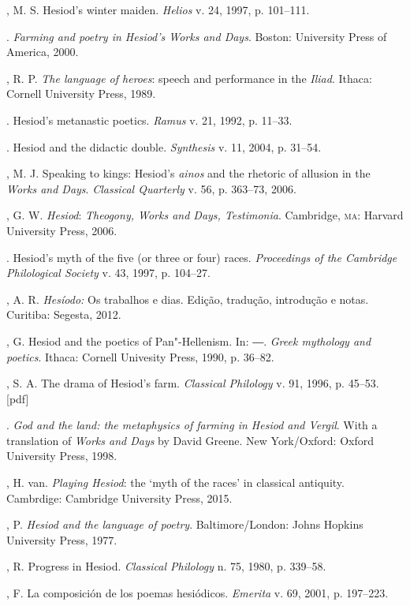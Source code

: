 \begin{bibliohedra}
, M. S. Hesiod's winter maiden. \emph{Helios} v. 24, 1997, p.
101--111.

\titidem. \emph{Farming and poetry in Hesiod's Works and Days}. Boston:
University Press of America, 2000.

, R. P. \emph{The language of heroes}: speech and performance in
the \emph{Iliad}. Ithaca: Cornell University Press, 1989.

\titidem. Hesiod's metanastic poetics. \emph{Ramus} v. 21, 1992, p. 11--33.

\titidem. Hesiod and the didactic double. \emph{Synthesis} v. 11, 2004, p.
31--54.

, M. J. Speaking to kings: Hesiod's \emph{ainos} and the rhetoric
of allusion in the \emph{Works and Days}. \emph{Classical Quarterly} v.
56, p. 363--73, 2006.

, G. W. \emph{Hesiod}: \emph{Theogony, Works and Days, Testimonia}.
Cambridge, \textsc{ma}: Harvard University Press, 2006.

\titidem. Hesiod's myth of the five (or three or four) races. \emph{Proceedings
of the Cambridge Philological Society} v. 43, 1997, p. 104--27.

, A. R. \emph{Hesíodo:} Os trabalhos e dias. Edição, tradução,
introdução e notas. Curitiba: Segesta, 2012.

, G. Hesiod and the poetics of Pan"-Hellenism. In: ―. \emph{Greek
mythology and poetics}. Ithaca: Cornell Univesity Press, 1990, p. 36--82.

, S. A. The drama of Hesiod's farm. \emph{Classical Philology} v.
91, 1996, p. 45--53. {[}pdf{]}

\titidem. \emph{God and the land: the metaphysics of farming in Hesiod and
Vergil}. With a translation of \emph{Works and Days} by David Greene.
New York/Oxford: Oxford University Press, 1998.

, H. van. \emph{Playing Hesiod}: the `myth of the races' in
classical antiquity. Cambrdige: Cambridge University Press, 2015.

, P. \emph{Hesiod and the language of poetry}. Baltimore/London:
Johns Hopkins University Press, 1977.

, R. Progress in Hesiod. \emph{Classical Philology} n. 75, 1980,
p. 339--58.

, F. La composición de los poemas hesiódicos.
\emph{Emerita} v. 69, 2001, p. 197--223.


\end{bibliohedra}
